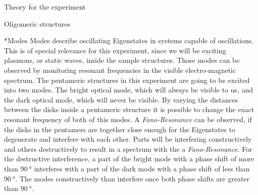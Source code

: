 \documentclass[pdftex, a4paper,11pt, twoside, UKenglish]{report}
\begin{document}
\begin{chapter}{Theory for the experiment}
\begin{section}{Oligomeric structures}
      \begin{subsection}*{Modes}
        Modes describe oscillating Eigenstates in systems capable of
        oscillations. This is of special relevance for this experiment, since we
        will be exciting plasmons, or static waves, inside the sample
        structures. Those modes can be observed by monitoring resonant
        frequencies in the visible electro-magnetic spectrum.
        The pentameric structures in this experiment are going to be excited
        into two modes. The bright optical mode, which will always be visible
        to us, and the dark optical mode, which will never be visible.
        By varying the distances between the disks inside a pentameric
        structure it is possible to change the exact resonant frequency of both
        of this modes.
        A \textit{Fano-Resonance} can be observed, if the disks in the pentamers
        are together close enough for the Eigenstates to degenerate and
        interfere with each other. Parts will be interfering constructively
        and others destructively to result in a spectrum with the a
        \textit{Fano-Resonance}.
        For the destructive interference, a part of the bright mode with a
        phase shift of more than $\SI{90}{\degree}$ interferes with a part of
        the dark mode with a phase shift of less than $\SI{90}{\degree}$.
        The modes constructively than interfere once both phase shifts are
        greater than $\SI{90}{\degree}$.
        
      \end{subsection}
      
    \end{section}
    
  \end{chapter}
         
         
         
\end{document}
